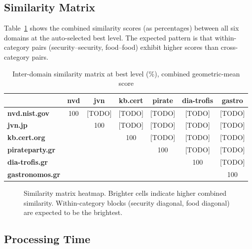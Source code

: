 \subsection{Similarity Matrix}
\label{subsec:similarity-matrix}

Table~\ref{tab:similarity-matrix} shows the combined similarity scores (as percentages) between all six domains at the auto-selected best level. The expected pattern is that within-category pairs (security--security, food--food) exhibit higher scores than cross-category pairs.

\begin{table}[htbp]
\centering
\caption{Inter-domain similarity matrix at best level (\%), combined geometric-mean score}
\label{tab:similarity-matrix}
\begin{tabular}{lcccccc}
\toprule
 & \textbf{nvd} & \textbf{jvn} & \textbf{kb.cert} & \textbf{pirate} & \textbf{dia-trofis} & \textbf{gastro} \\
\midrule
\textbf{nvd.nist.gov}    & 100 & [TODO] & [TODO] & [TODO] & [TODO] & [TODO] \\
\textbf{jvn.jp}          &     & 100    & [TODO] & [TODO] & [TODO] & [TODO] \\
\textbf{kb.cert.org}     &     &        & 100    & [TODO] & [TODO] & [TODO] \\
\textbf{pirateparty.gr}  &     &        &        & 100    & [TODO] & [TODO] \\
\textbf{dia-trofis.gr}   &     &        &        &        & 100    & [TODO] \\
\textbf{gastronomos.gr}  &     &        &        &        &        & 100    \\
\bottomrule
\end{tabular}
\end{table}

\begin{figure}[htbp]
    \centering
    \caption{Similarity matrix heatmap. Brighter cells indicate higher combined similarity. Within-category blocks (security diagonal, food diagonal) are expected to be the brightest.}
    \label{fig:similarity-heatmap}
\end{figure}

\subsection{Processing Time}
\label{subsec:processing-time}

